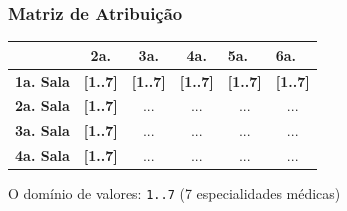 \begin{frame}
  \frametitle{Matriz de Atribuição}

\begin{table}[]
\begin{tabular}{|c|c|c|c|c|c|}
\hline
{\color[HTML]{00009B} }                                 & {\color[HTML]{CB0000} \textbf{2a.}}                             & {\color[HTML]{CB0000} \textbf{3a.}}        & {\color[HTML]{CB0000} \textbf{4a.}}        & \multicolumn{1}{l|}{{\color[HTML]{CB0000} \textbf{5a.}}}        & \multicolumn{1}{l|}{{\color[HTML]{CB0000} \textbf{6a.}}}        \\ \hline
{\color[HTML]{303498} \textbf{1a. Sala}}                       & {\color[HTML]{009901} \textbf{{[}1..7{]}}}                      & {\color[HTML]{009901} \textbf{{[}1..7{]}}} & {\color[HTML]{009901} \textbf{{[}1..7{]}}} & \multicolumn{1}{l|}{{\color[HTML]{009901} \textbf{{[}1..7{]}}}} & \multicolumn{1}{l|}{{\color[HTML]{009901} \textbf{{[}1..7{]}}}} \\ \hline
{\color[HTML]{303498} \textbf{2a. Sala}}                       & {\color[HTML]{009901} \textbf{{[}1..7{]}}}                      & ...                                        & ...                                        & ...                                                             & ...                                                             \\ \hline
{\color[HTML]{303498} \textbf{3a. Sala}}                       & {\color[HTML]{009901} \textbf{{[}1..7{]}}}                      & ...                                        & ...                                        & ...                                                             & ...                                                             \\ \hline
\multicolumn{1}{|l|}{{\color[HTML]{303498} \textbf{4a. Sala}}} & \multicolumn{1}{l|}{{\color[HTML]{009901} \textbf{{[}1..7{]}}}} & ...                                        & ...                                        & ...                                                             & ...                                                             \\ \hline
\end{tabular}
\end{table}

O domínio de valores: \texttt{1..7} (7 especialidades médicas)

\end{frame}



